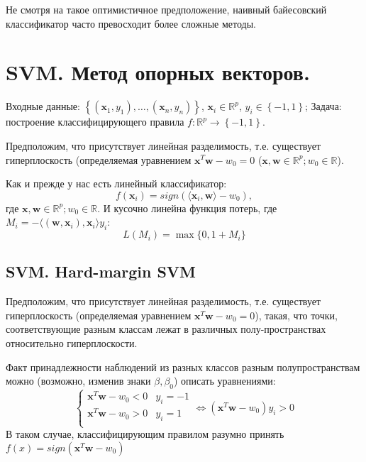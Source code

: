 \documentclass{article}
\begin{document}
	Не смотря на такое оптимистичное предположение, наивный байесовский классификатор часто превосходит более сложные методы.
\section{SVM. Метод опорных векторов.}


Входные данные:  $\left\{\left(\boldsymbol{x}_1, y_1\right), \dots, \left(\boldsymbol{x}_n, y_n\right)\right\}$, $\boldsymbol{x}_i\in\mathbb{R}^p$, $y_i\in\left\{-1, 1\right\}$;
Задача: построение классифицирующего правила $f:\mathbb{R}^p\rightarrow \left\{-1, 1\right\}$.


Предположим, что присутствует линейная разделимость, т.е. существует гиперплоскость (определяемая уравнением $\boldsymbol{x}^{T}\boldsymbol{w}-w_0=0$ ($\boldsymbol{x},\boldsymbol{w}\in\mathbb{R}^p; w_0\in\mathbb{R}$).

Как и прежде у нас есть линейный классификатор:
	$$f\left(\boldsymbol{x}_i\right)=sign\left(\langle\boldsymbol{x}_i,\boldsymbol{w}\rangle -w_0\right),$$
 где $\boldsymbol{x},\boldsymbol{w}\in\mathbb{R}^p; w_0\in\mathbb{R}$. 
И кусочно линейна функция потерь, где $M_i=-\langle (\boldsymbol{w}, \boldsymbol{x}_i),\boldsymbol{x}_i\rangle y_i$:
$$L(M_i)=\max\{0,1+M_i\}$$

\subsection{SVM. Hard-margin SVM}
Предположим, что присутствует линейная разделимость, т.е. существует гиперплоскость (определяемая уравнением $\boldsymbol{x}^{T}\boldsymbol{w}-w_0=0$),
такая, что точки, соответствующие разным классам лежат в различных полу-пространствах относительно гиперплоскости.

Факт принадлежности наблюдений из разных классов разным полупространствам можно (возможно, изменив знаки $\beta, \beta_0$)
описать уравнениями:
$$
\begin{cases}
 
	\boldsymbol{x}^{T}\boldsymbol{w}-w_0< 0 & y_i=-1 \\
	\boldsymbol{x}^{T}\boldsymbol{w}-w_0 > 0 & y_i=1 \\
   
\end{cases}
\Leftrightarrow
(\boldsymbol{x}^{T}\boldsymbol{w}-w_0) y_i > 0
$$
В таком случае, классифицирующим правилом разумно принять $f\left(x\right)=sign{\left(\boldsymbol{x}^{T}\boldsymbol{w}-w_0\right)}$
\end{document}
